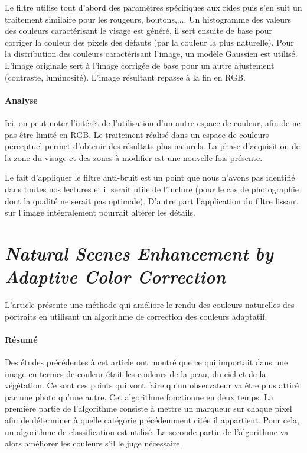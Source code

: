 \documentclass[11pt, french]{report-rd-info}
\begin{document}
Le filtre utilise tout d'abord des paramètres spécifiques aux rides puis s'en suit un traitement similaire pour les rougeurs, boutons,.... Un histogramme des valeurs des couleurs caractérisant le visage est généré, il sert ensuite de base pour corriger la couleur des pixels des défauts (par la couleur la plus naturelle). Pour la distribution des couleurs caractérisant l'image, un modèle Gaussien est utilisé. L’image originale sert à l'image corrigée de base pour un autre ajustement (contraste, luminosité). L'image résultant repasse à la fin en RGB.

\paragraph{Analyse}
Ici, on peut noter l'intérêt de l'utilisation d'un autre espace de couleur, afin de ne pas être limité en RGB. Le traitement réalisé dans un espace de couleurs perceptuel permet d'obtenir des résultats plus naturels. La phase d'acquisition de la zone du visage et des zones à modifier est une nouvelle fois présente. 

Le fait d’appliquer le filtre anti-bruit est un point que nous n’avons pas identifié dans toutes nos lectures et il serait utile de l’inclure (pour le cas de photographie dont la qualité ne serait pas optimale). D’autre part l’application du filtre lissant sur l’image intégralement pourrait altérer les détails.


\section{\emph{Natural Scenes Enhancement by Adaptive Color Correction}}
L'article \cite{Naccari} présente une méthode qui améliore le rendu des couleurs naturelles des portraits en utilisant un algorithme de correction des couleurs adaptatif.

\paragraph{Résumé}
Des études précédentes à cet article ont montré que ce qui importait dans une image en termes de couleur était les couleurs de la peau, du ciel et de la végétation. Ce sont ces points qui vont faire qu'un observateur va être plus attiré par une photo qu'une autre. Cet algorithme fonctionne en deux temps. La première partie de l'algorithme consiste à mettre un marqueur sur chaque pixel afin de déterminer à quelle catégorie précédemment citée il appartient. Pour cela, un algorithme de classification est utilisé. La seconde partie de l'algorithme va alors améliorer les couleurs s'il le juge nécessaire.
\end{document}
